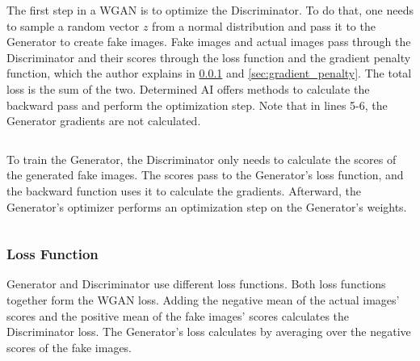 \begin{listing}[H]
\inputminted{python}{resources/codes/train_batch.py}
\end{listing}

The first step in a WGAN is to optimize the Discriminator. To do that, one needs to sample a  random vector $ z $ from a normal distribution and pass it to the Generator to create fake images. Fake images and actual images pass through the Discriminator and their scores through the loss function and the gradient penalty function, which the author explains in \ref{sec:loss_function} and \ref{sec:gradient_penalty}. The total loss is the sum of the two. Determined AI offers methods to calculate the backward pass and perform the optimization step. Note that in lines 5-6, the Generator gradients are not calculated.  \\

\begin{listing}[H]
\inputminted{python}{resources/codes/optimize_discriminator.py}
\end{listing}

\newpage

To train the Generator, the Discriminator only needs to calculate the scores of the generated fake images. The scores pass to the Generator's loss function, and the backward function uses it to calculate the gradients. Afterward, the Generator's optimizer performs an optimization step on the Generator's weights.

\begin{listing}[H]
\inputminted{python}{resources/codes/optimize_generator.py}
\end{listing}

\subsubsection{Loss Function}
\label{sec:loss_function}

Generator and Discriminator use different loss functions. Both loss functions together form the WGAN loss. Adding the negative mean of the actual images' scores and the positive mean of the fake images' scores calculates the Discriminator loss. The Generator's loss calculates by averaging over the negative scores of the fake images.

\begin{listing}[H]
\inputminted{python}{resources/codes/wgan_loss.py}
\end{listing}


